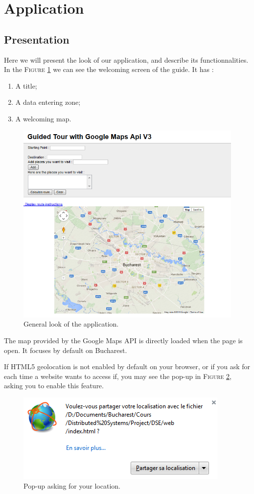 \newpage\section{Application}
	\subsection{Presentation}
	
	Here we will present the look of our application, and describe its functionnalities. In the \textsc{Figure} \ref{fig:general} we can see the welcoming screen of the guide.
	It has :
	\begin{enumerate}
		\item A title;
		\item A data entering zone;
		\item A welcoming map.
	\end{enumerate}
		\begin{figure}[h!]
			\centering
			\includegraphics[scale=0.7]{input/general_look.png}
			\caption{\label{fig:general}General look of the application.}
		\end{figure}
		The map provided by the Google Maps API is directly loaded when the page is open. It focuses by default on Bucharest.
		
		\newpage If HTML5 geolocation is not enabled by default on your browser, or if you ask for each time a website wants to access if, you may see the pop-up in \textsc{Figure} \ref{fig:geoloc}, asking you to enable this feature.
		\begin{figure}[h!]
			\centering
			\includegraphics{input/geoloc.png}
			\caption{\label{fig:geoloc}Pop-up asking for your location.}
		\end{figure}
		
